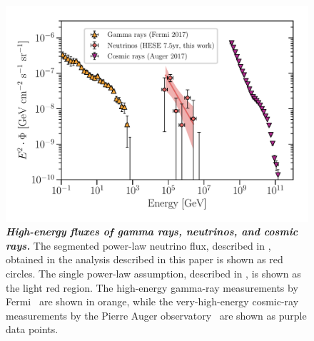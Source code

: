 \begin{figure}
	\centering
	\includegraphics[width=\linewidth]{figures/hese_paper/astrophysical_overview}
	\internallinenumbers
	\caption{\textbf{\textit{High-energy fluxes of gamma rays, neutrinos, and cosmic rays.}}
		The segmented power-law neutrino flux, described in , obtained in the analysis described in this paper is shown as red circles.
		The single power-law assumption, described in , is shown as the light red region.
		The high-energy gamma-ray measurements by Fermi~\cite{Ackermann:2014usa} are shown in orange, while the very-high-energy cosmic-ray measurements by the Pierre Auger observatory~\cite{Fenu:2017hlc} are shown as purple data points.}\label{fig:all_cosmic}
\end{figure}